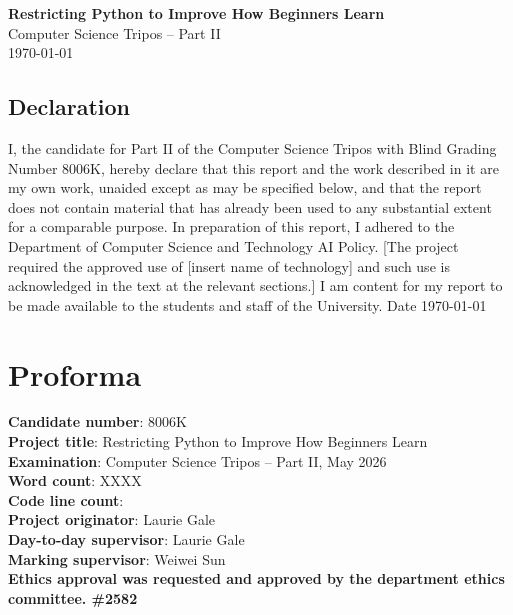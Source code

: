 \documentclass[12pt,a4paper,twoside,openright]{report}
\begin{document}


\pagestyle{empty}


\vspace*{60mm}
\begin{center}
\Huge
\textbf{Restricting Python to Improve How Beginners Learn} \\[5mm]
Computer Science Tripos -- Part II \\[5mm]
\today  %
\end{center}

 
\newpage
\section*{Declaration}

I, the candidate for Part II of the Computer Science Tripos with Blind Grading Number 8006K, hereby declare that this report and the work described in it are my own work, unaided except as may be specified below, and that the report does not contain material that has already been used to any substantial extent for a comparable purpose. In preparation of this report, I adhered to the Department of Computer Science and Technology AI Policy. [The project required the approved use of [insert name of technology] and such use is acknowledged in the text at the relevant sections.] I am content for my report to be made available to the students and staff of the University.
Date \today

\medskip
{}



\chapter*{Proforma}


\textbf{Candidate number}: 8006K \\
\textbf{Project title}: Restricting Python to Improve How Beginners Learn \\
\textbf{Examination}: Computer Science Tripos -- Part II, May 2026  \\
\textbf{Word count}: XXXX \\
\textbf{Code line count}: \\
\textbf{Project originator}: Laurie Gale  \\
\textbf{Day-to-day supervisor}: Laurie Gale \\
\textbf{Marking supervisor}: Weiwei Sun\\
\textbf{Ethics approval was requested and approved by the department ethics committee. \#2582} \\
\end{document}
